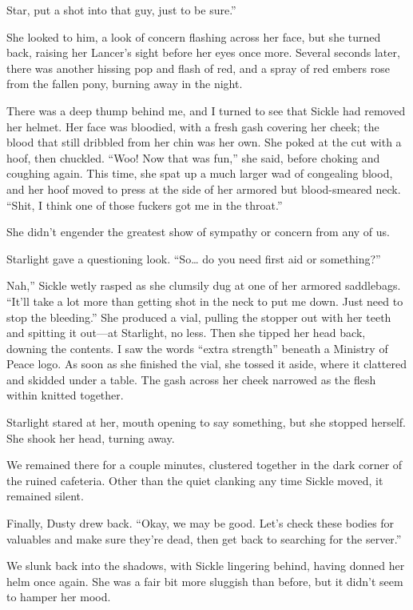 \leavevmode{}Star, put a shot into that guy, just to be sure.”

She looked to him, a look of concern flashing across her face, but she turned back, raising her Lancer’s sight before her eyes once more. Several seconds later, there was another hissing pop and flash of red, and a spray of red embers rose from the fallen pony, burning away in the night.

There was a deep thump behind me, and I turned to see that Sickle had removed her helmet. Her face was bloodied, with a fresh gash covering her cheek; the blood that still dribbled from her chin was her own. She poked at the cut with a hoof, then chuckled. “Woo! Now that was fun,” she said, before choking and coughing again. This time, she spat up a much larger wad of congealing blood, and her hoof moved to press at the side of her armored but blood-smeared neck. “Shit, I think one of those fuckers got me in the throat.”

She didn’t engender the greatest show of sympathy or concern from any of us.

Starlight gave a questioning look. “So… do you need first aid or something?”

\leavevmode{}Nah,” Sickle wetly rasped as she clumsily dug at one of her armored saddlebags. “It’ll take a lot more than getting shot in the neck to put me down. Just need to stop the bleeding.” She produced a vial, pulling the stopper out with her teeth and spitting it out—at Starlight, no less. Then she tipped her head back, downing the contents. I saw the words “extra strength” beneath a Ministry of Peace logo. As soon as she finished the vial, she tossed it aside, where it clattered and skidded under a table. The gash across her cheek narrowed as the flesh within knitted together.

Starlight stared at her, mouth opening to say something, but she stopped herself. She shook her head, turning away.

We remained there for a couple minutes, clustered together in the dark corner of the ruined cafeteria. Other than the quiet clanking any time Sickle moved, it remained silent.

Finally, Dusty drew back. “Okay, we may be good. Let’s check these bodies for valuables and make sure they’re dead, then get back to searching for the server.”

We slunk back into the shadows, with Sickle lingering behind, having donned her helm once again. She was a fair bit more sluggish than before, but it didn’t seem to hamper her mood.


